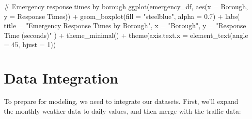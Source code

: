 \documentclass[
  letterpaper,
  DIV=11,
  numbers=noendperiod]{scrreprt}
\newenvironment{Shaded}{\begin{snugshade}}{\end{snugshade}}
\newcommand{\AttributeTok}[1]{\textcolor[rgb]{0.40,0.45,0.13}{#1}}
\newcommand{\CommentTok}[1]{\textcolor[rgb]{0.37,0.37,0.37}{#1}}
\newcommand{\DecValTok}[1]{\textcolor[rgb]{0.68,0.00,0.00}{#1}}
\newcommand{\FloatTok}[1]{\textcolor[rgb]{0.68,0.00,0.00}{#1}}
\newcommand{\FunctionTok}[1]{\textcolor[rgb]{0.28,0.35,0.67}{#1}}
\newcommand{\NormalTok}[1]{\textcolor[rgb]{0.00,0.23,0.31}{#1}}
\newcommand{\SpecialCharTok}[1]{\textcolor[rgb]{0.37,0.37,0.37}{#1}}
\newcommand{\StringTok}[1]{\textcolor[rgb]{0.13,0.47,0.30}{#1}}
\begin{document}
\begin{Shaded}
\begin{Highlighting}[]
\CommentTok{\# Emergency response times by borough}
\FunctionTok{ggplot}\NormalTok{(emergency\_df, }\FunctionTok{aes}\NormalTok{(}\AttributeTok{x =}\NormalTok{ Borough, }\AttributeTok{y =} \StringTok{\textasciigrave{}}\AttributeTok{Response Times}\StringTok{\textasciigrave{}}\NormalTok{)) }\SpecialCharTok{+}
  \FunctionTok{geom\_boxplot}\NormalTok{(}\AttributeTok{fill =} \StringTok{"steelblue"}\NormalTok{, }\AttributeTok{alpha =} \FloatTok{0.7}\NormalTok{) }\SpecialCharTok{+}
  \FunctionTok{labs}\NormalTok{(}
    \AttributeTok{title =} \StringTok{"Emergency Response Times by Borough"}\NormalTok{,}
    \AttributeTok{x =} \StringTok{"Borough"}\NormalTok{,}
    \AttributeTok{y =} \StringTok{"Response Time (seconds)"}
\NormalTok{  ) }\SpecialCharTok{+}
  \FunctionTok{theme\_minimal}\NormalTok{() }\SpecialCharTok{+}
  \FunctionTok{theme}\NormalTok{(}\AttributeTok{axis.text.x =} \FunctionTok{element\_text}\NormalTok{(}\AttributeTok{angle =} \DecValTok{45}\NormalTok{, }\AttributeTok{hjust =} \DecValTok{1}\NormalTok{))}
\end{Highlighting}
\end{Shaded}

\section{Data Integration}\label{data-integration}

To prepare for modeling, we need to integrate our datasets. First, we'll
expand the monthly weather data to daily values, and then merge with the
traffic data:
\end{document}
